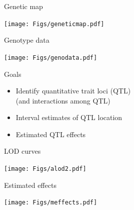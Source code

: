 \documentclass[12pt]{article}
\newcommand{\headsize}{\fontsize{35}{35} \selectfont}
\newcommand{\smallsize}{\fontsize{25}{30} \selectfont}
\begin{document}
\newpage

\headsize \color{myyellow}
\hfill \begin{minipage}{5.75in}
\centering
Genetic map
\end{minipage}

\vfill

\centerline{\texttt{[image: Figs/geneticmap.pdf]}}


\newpage

\headsize \color{myyellow}
\hfill \begin{minipage}{5.75in}
\centering
Genotype data
\end{minipage}

\vfill

\centerline{\texttt{[image: Figs/genodata.pdf]}}


\newpage

\headsize \color{myyellow}
\hfill \begin{minipage}{5.75in}
\centering
Goals
\end{minipage}

\vspace{3cm}

\color{mywhite} \smallsize

\hfill \begin{minipage}[t]{9.5in}
\begin{itemize}
\itemsep24pt
\item Identify quantitative trait loci (QTL) \\[6pt]
   {\color{myblue}   (and interactions among QTL)}
\item Interval estimates of QTL location
\item Estimated QTL effects 
\end{itemize} \end{minipage}

\newpage

\headsize \color{myyellow}
\hfill \begin{minipage}{5.75in}
\centering
LOD curves
\end{minipage}

\vfill

\centerline{\texttt{[image: Figs/alod2.pdf]}}

\newpage

\headsize \color{myyellow}
\hfill \begin{minipage}{5.75in}
\centering
Estimated effects
\end{minipage}

\vfill

\centerline{\texttt{[image: Figs/meffects.pdf]}}
\end{document}
